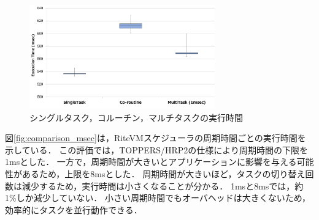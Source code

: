 \documentclass[submit,techrep]{ipsj}
\begin{document}


\begin{figure}[t]
    \centering
    \includegraphics[width=8cm,clip]{../EMSOFT2016/figure/comparison_s_c_m.pdf}
    \vspace{-2mm}
    \caption{シングルタスク，コルーチン，マルチタスクの実行時間}
\vspace{-3mm}
    \label{fig:comparison_s_c_m}
\end{figure}

図\ref{fig:comparison_msec}は，RiteVMスケジューラの周期時間ごとの実行時間を示している．
この評価では，TOPPERS/HRP2の仕様により周期時間の下限を1msとした．
一方で，周期時間が大きいとアプリケーションに影響を与える可能性があるため，上限を8msとした．
周期時間が大きいほど，タスクの切り替え回数は減少するため，実行時間は小さくなることが分かる．
1msと8msでは，約1\%しか減少していない．
小さい周期時間でもオーバヘッドは大きくないため，効率的にタスクを並行動作できる．
\end{document}
